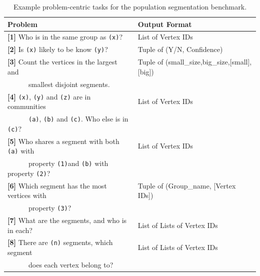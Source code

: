     
    \begin{table}[t]
        \begin{center}
        {\footnotesize
            \begin{tabular}{l|l} 
                \textbf{Problem}                                                            &   \textbf{Output Format}\\
                \hline
                \textbf{[1]} Who is in the same group as \texttt{(x)}?                                   & List of Vertex IDs    \\          
                \textbf{[2]} Is \texttt{(x)} likely to be know \texttt{(y)}?                             & Tuple of (Y/N, Confidence)  \\               
                \textbf{[3]} Count the vertices in the largest and                                       & Tuple of (small\_size,big\_size,[small],[big])\\
                ~~~~~~smallest disjoint segments.                                                  & ~ \\
                \textbf{[4]} \texttt{(x)}, \texttt{(y)} and \texttt{(z)} are in communities              & List of Vertex IDs\\
                ~~~~~~\texttt{(a)}, \texttt{(b)} and \texttt{(c)}. Who else is in \texttt{(c)}?   &~ \\
                \textbf{[5]} Who shares a segment with both \texttt{(a)} with                & List of Vertex IDs\\
                ~~~~~~property \texttt{(1)}and \texttt{(b)} with property \texttt{(2)}?          &\\
                \textbf{[6]} Which segment has the most vertices with                          & Tuple of (Group\_name, [Vertex IDs])\\
                ~~~~~~property \texttt{(3)}?                                                      & \\
                \textbf{[7]} What are the segments, and who is in each?                               & List of Lists of Vertex IDs   \\ 
                \textbf{[8]} There are \texttt{(n)} segments, which segment                      & List of Lists of Vertex IDs\\
                ~~~~~~does each vertex belong to?                                                 &~\\                

            \end{tabular}
        \caption{Example problem-centric tasks for the population segmentation benchmark.} 
        \label{Table:cd-problem-definition}
        }
        \end{center}
    \end{table}


